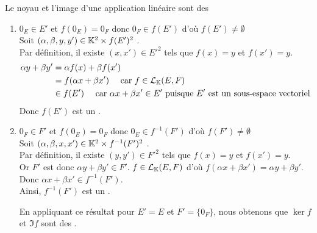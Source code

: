 \documentclass{article}
\begin{document}
\begin{question_kholle}
	[{
				Soit $f \in \mathcal{L}_\K(E, F)$.
				\begin{equation*}
					\begin{aligned}
						\ker f & = \left\{ x \in E \;|\; f(x) = 0_F \right\} = f^{-1} (\{0_F\}) \\
						\Im f  & = \left\{ y \in F \;|\; \exists x \in E : f(x) = y \right\}
					\end{aligned}
				\end{equation*}
				Nous démontrerons le résultat plus général suivant~:
				\begin{enumerate}[label=$(\roman*)$, labelindent=0pt, leftmargin=!]
					\item $f(E')$ est un \sev de $F$.
					\item $f^{-1}(F')$ est un \sev de $E$.
				\end{enumerate}
			}]
	{Le noyau et l'image d'une application linéaire sont des \sevs}
	\hfill\\
	\begin{enumerate}[label=$(\roman*)$, labelindent=0pt, leftmargin=!]
		\item $0_E \in E'$ et $f(0_E) = 0_F$ donc $0_F \in f(E')$ d'où $f(E') \neq \emptyset$ \\
		      Soit $(\alpha, \beta, y, y') \in \mathbb K^2 \times f(E')^2$ \fqs. \\
		      Par définition, il existe $(x, x') \in E'^2$ tels que $f(x) = y$ et $f(x') = y$.
		      \begin{equation*}
			      \begin{aligned}
				      \alpha y + \beta y'
				       & = \alpha f(x) + \beta f(x')                                                                     \\
				       & = f( \alpha x + \beta x' ) \quad \text{ car } f \in \mathcal{L}_{\mathbb K}(E, F)                        \\
				       & \in f(E') \quad \text{ car } \alpha x + \beta x' \in E' \text{ puisque } E' \text{ est un sous-espace vectoriel }
			      \end{aligned}
		      \end{equation*}
		      Donc $f(E')$ est un \sev.

		\item $0_F \in F'$ et $f(0_E) = 0_F$ donc $0_E \in f^{-1}(F')$ d'où $f(F') \neq \emptyset$ \\
		      Soit $(\alpha, \beta, x, x') \in \mathbb K^2 \times f^{-1}(F')^2$ \fqs. \\
		      Par définition, il existe $(y, y') \in F'^2$ tels que $f(x) = y$ et $f(x') = y$. \\
		      Or $F'$ est \sev donc $\alpha y + \beta y' \in F'$. $f \in \mathcal{L}_\K(E, F)$ d'où $f(\alpha x + \beta x') = \alpha y + \beta y'$. Donc $\alpha x + \beta x' \in f^{-1}(F')$. \\
		      Ainsi, $f^{-1}(F')$ est un \sev.

		      En appliquant ce résultat pour $E' = E$ et $F' = \{0_F\}$, nous obtenons que $\ker f$ et $\Im f$ sont des \sevs.
	\end{enumerate}
\end{question_kholle}
\end{document}
